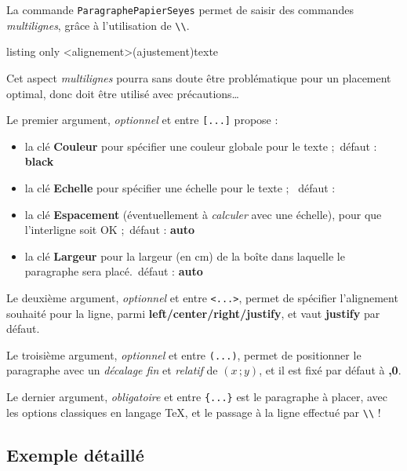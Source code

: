 \documentclass[a4paper]{article}
\newcommand\Cle[1]{{\bfseries\sffamily\textlangle #1\textrangle}}
\begin{document}
La commande \texttt{ParagraphePapierSeyes} permet de saisir des commandes \textit{multilignes}, grâce à l'utilisation de \texttt{\textbackslash\textbackslash}.

\begin{PresentationCode}{listing only}
\ParagraphePapierSeyes[options]<alignement>(ajustement){texte}
\end{PresentationCode}

\faBomb{} Cet aspect \textit{multilignes} pourra sans doute être problématique pour un placement optimal, donc doit être utilisé avec précautions\ldots

\smallskip

Le premier argument, \textit{optionnel} et entre \texttt{[...]} propose :

\begin{itemize}
	\item la clé \Cle{Couleur} pour spécifier une couleur globale pour le texte ;\hfill~défaut : \Cle{black}
	\item la clé \Cle{Echelle} pour spécifier une échelle pour le texte ; \hfill~défaut : \Cle{1}
	\item la clé \Cle{Espacement} (éventuellement à \textit{calculer} avec une échelle), pour que l'interligne soit OK ;\hfill~défaut : \Cle{auto}
	\item la clé \Cle{Largeur} pour la largeur (en cm) de la boîte dans laquelle le paragraphe sera placé.\hfill~défaut : \Cle{auto}
\end{itemize}

Le deuxième argument, \textit{optionnel} et entre \texttt{<...>}, permet de spécifier l'alignement souhaité pour la ligne, parmi \Cle{left/center/right/justify}, et vaut \Cle{justify} par défaut.

\smallskip

Le troisième argument, \textit{optionnel} et entre \texttt{(...)}, permet de positionner le paragraphe avec un \textit{décalage fin} et \textit{relatif} de $(x\,;y)$, et il est fixé par défaut à \Cle{0,0}.

\smallskip

Le dernier argument, \textit{obligatoire} et entre \texttt{\{...\}} est le paragraphe à placer, avec les options classiques en langage \TeX{}, et le passage à la ligne effectué par \texttt{\textbackslash\textbackslash} !

\subsection{Exemple \og détaillé \fg}
\end{document}
